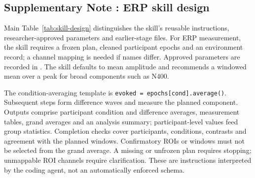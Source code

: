 \subsection*{Supplementary Note \thesuppnote: ERP skill design}
\label{si:skills}

Main Table~\ref*{tab:skill-design} distinguishes the skill's reusable instructions, researcher-approved parameters and earlier-stage files. For ERP measurement, the skill requires a frozen plan, cleaned participant epochs and an environment record; a channel mapping is needed if names differ. Approved parameters are recorded in . The skill defaults to mean amplitude and recommends a windowed mean over a peak for broad components such as N400.

The condition-averaging template is \texttt{evoked = epochs[cond].average()}. Subsequent steps form difference waves and measure the planned component. Outputs comprise participant condition and difference averages, measurement tables, grand averages and an analysis summary; participant-level values feed group statistics. Completion checks cover participants, conditions, contrasts and agreement with the planned windows. Confirmatory ROIs or windows must not be selected from the grand average. A missing or unfrozen plan requires stopping; unmappable ROI channels require clarification. These are instructions interpreted by the coding agent, not an automatically enforced schema.

\FloatBarrier
{}
